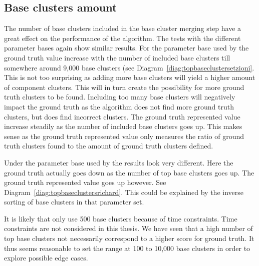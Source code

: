 \subsection{Base clusters amount}
The number of base clusters included in the base cluster merging step have a great effect on the performance of the \CTC algorithm. The tests with the different parameter bases again show similar results. For the parameter base used by \citeauthor{Oren1998} the ground truth value increase with the number of included base clusters till somewhere around 9,000 base clusters (see Diagram~\ref{diag:topbaseclustersetzioni}. This is not too surprising as adding more base clusters will yield a higher amount of component clusters. This will in turn create the possibility for more ground truth clusters to be found. Including too many base clusters will negatively impact the ground truth as the algorithm does not find more ground truth clusters, but does find incorrect clusters. The ground truth represented value increase steadily as the number of included base clusters goes up. This makes sense as the ground truth represented value only measures the ratio of ground truth clusters found to the amount of ground truth clusters defined.

Under the parameter base used by \supervisor the results look very different. Here the ground truth actually goes down as the number of top base clusters goes up. The ground truth represented value goes up however. See Diagram~\ref{diag:topbaseclustersrichard}. This could be explained by the inverse sorting of base clusters in that parameter set.

It is likely that \citeauthor{Oren1998} only use 500 base clusters because of time constraints. Time constraints are not considered in this thesis. We have seen that a high number of top base clusters not necessarily correspond to a higher score for ground truth. It thus seems reasonable to set the range at 100 to 10,000 base clusters in order to explore possible edge cases.

